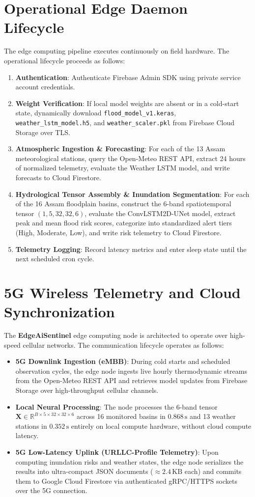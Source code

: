 \documentclass[12pt,a4paper,oneside]{report}
\begin{document}
\section{Operational Edge Daemon Lifecycle}
The edge computing pipeline executes continuously on field hardware. The operational lifecycle proceeds as follows:
\begin{enumerate}
    \item \textbf{Authentication}: Authenticate Firebase Admin SDK using private service account credentials.
    \item \textbf{Weight Verification}: If local model weights are absent or in a cold-start state, dynamically download \texttt{flood\_model\_v1.keras}, \texttt{weather\_lstm\_model.h5}, and \texttt{weather\_scaler.pkl} from Firebase Cloud Storage over TLS.
    \item \textbf{Atmospheric Ingestion \& Forecasting}: For each of the 13 Assam meteorological stations, query the Open-Meteo REST API, extract 24 hours of normalized telemetry, evaluate the Weather LSTM model, and write forecasts to Cloud Firestore.
    \item \textbf{Hydrological Tensor Assembly \& Inundation Segmentation}: For each of the 16 Assam floodplain basins, construct the 6-band spatiotemporal tensor $(1, 5, 32, 32, 6)$, evaluate the ConvLSTM2D-UNet model, extract peak and mean flood risk scores, categorize into standardized alert tiers (High, Moderate, Low), and write risk telemetry to Cloud Firestore.
    \item \textbf{Telemetry Logging}: Record latency metrics and enter sleep state until the next scheduled cron cycle.
\end{enumerate}

\section{5G Wireless Telemetry and Cloud Synchronization}
The \textbf{EdgeAiSentinel} edge computing node is architected to operate over high-speed cellular networks. The communication lifecycle operates as follows:
\begin{itemize}
    \item \textbf{5G Downlink Ingestion (eMBB)}: During cold starts and scheduled observation cycles, the edge node ingests live hourly thermodynamic streams from the Open-Meteo REST API and retrieves model updates from Firebase Storage over high-throughput cellular channels.
    \item \textbf{Local Neural Processing}: The node processes the 6-band tensor $\mathbf{X} \in \mathbb{R}^{B \times 5 \times 32 \times 32 \times 6}$ across 16 monitored basins in $0.868\,\text{s}$ and 13 weather stations in $0.352\,\text{s}$ entirely on local compute hardware, without cloud compute latency.
    \item \textbf{5G Low-Latency Uplink (URLLC-Profile Telemetry)}: Upon computing inundation risks and weather states, the edge node serializes the results into ultra-compact JSON documents ($\approx 2.4\,\text{KB}$ each) and commits them to Google Cloud Firestore via authenticated gRPC/HTTPS sockets over the 5G connection.
\end{itemize}
\end{document}
